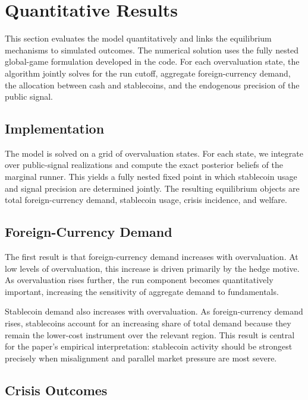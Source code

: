 \section{Quantitative Results}

This section evaluates the model quantitatively and links the equilibrium mechanisms to simulated outcomes. The numerical solution uses the fully nested global-game formulation developed in the code. For each overvaluation state, the algorithm jointly solves for the run cutoff, aggregate foreign-currency demand, the allocation between cash and stablecoins, and the endogenous precision of the public signal.

\subsection{Implementation}

The model is solved on a grid of overvaluation states. For each state, we integrate over public-signal realizations and compute the exact posterior beliefs of the marginal runner. This yields a fully nested fixed point in which stablecoin usage and signal precision are determined jointly. The resulting equilibrium objects are total foreign-currency demand, stablecoin usage, crisis incidence, and welfare.

\subsection{Foreign-Currency Demand}

The first result is that foreign-currency demand increases with overvaluation. At low levels of overvaluation, this increase is driven primarily by the hedge motive. As overvaluation rises further, the run component becomes quantitatively important, increasing the sensitivity of aggregate demand to fundamentals.

Stablecoin demand also increases with overvaluation. As foreign-currency demand rises, stablecoins account for an increasing share of total demand because they remain the lower-cost instrument over the relevant region. This result is central for the paper's empirical interpretation: stablecoin activity should be strongest precisely when misalignment and parallel market pressure are most severe.

\subsection{Crisis Outcomes}

